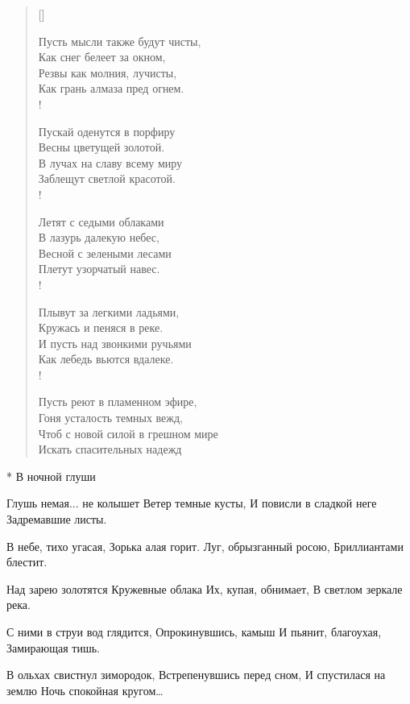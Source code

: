 \settowidth{\versewidth}{Пусть мысли также будут чисты,}
\begin{verse}[\versewidth]
\begin{altverse}
Пусть мысли также будут чисты,\\
          Как снег белеет за окном,\\
Резвы как молния, лучисты,\\
          Как грань алмаза пред огнем.\\!

Пускай оденутся в порфиру\\
          Весны цветущей золотой.\\
В лучах на славу всему миру\\
          Заблещут светлой красотой.\\!

Летят с седыми облаками\\
          В лазурь далекую небес,\\
Весной с зелеными лесами\\
          Плетут узорчатый навес.\\!

Плывут за легкими ладьями,\\
          Кружась и пеняся в реке.\\
И пусть над звонкими ручьями\\
          Как лебедь вьются вдалеке.\\!

Пусть реют в пламенном эфире,\\
          Гоня усталость темных вежд,\\
Чтоб с новой силой в грешном мире\\
Искать спасительных надежд\ldotst
\end{altverse}
\end{verse}
* В ночной глуши

Глушь немая... не колышет
Ветер темные кусты,
И повисли в сладкой неге
Задремавшие листы.

В небе, тихо угасая,
Зорька алая горит.
Луг, обрызганный росою,
Бриллиантами блестит.

Над зарею золотятся
Кружевные облака
Их, купая, обнимает,
В светлом зеркале река.

С ними в струи вод глядится,
Опрокинувшись, камыш
И пьянит, благоухая,
Замирающая тишь.

В ольхах свистнул зимородок,
Встрепенувшись перед сном,
И спустилася на землю
Ночь спокойная кругом…



